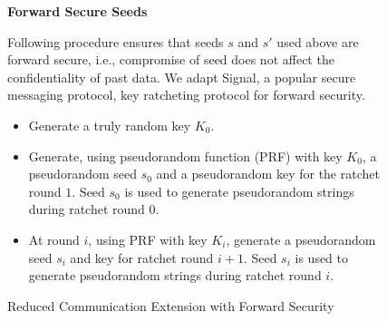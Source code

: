 \begin{figure}
\begin{mdframed}[style=myframe]
\vspace{2pt}

\textbf{Forward Secure Seeds}
\vspace{2pt}

Following procedure ensures that seeds $s$ and $s'$ used above are forward
	secure, i.e., compromise of seed does not affect the confidentiality of past
	data. We adapt Signal, a popular secure messaging protocol, key ratcheting
	protocol for forward security.

\begin{itemize}[leftmargin=*,itemsep=2pt,topsep=2pt]

	\item Generate a truly random key $K_0$.

	\item Generate, using pseudorandom function (PRF) with key $K_0$, a
		pseudorandom seed $s_0$ and a pseudorandom key for the ratchet round $1$.
		Seed $s_0$ is used to generate pseudorandom strings during ratchet round
		$0$.

	\item At round $i$, using PRF with key $K_i$, generate a pseudorandom seed
		$s_i$ and key for ratchet round $i+1$. Seed $s_i$ is used to generate
		pseudorandom strings during ratchet round $i$.

\end{itemize}

\end{mdframed}
\caption{Reduced Communication Extension with Forward Security}
\label{fig:extended_protocol}
\end{figure}
